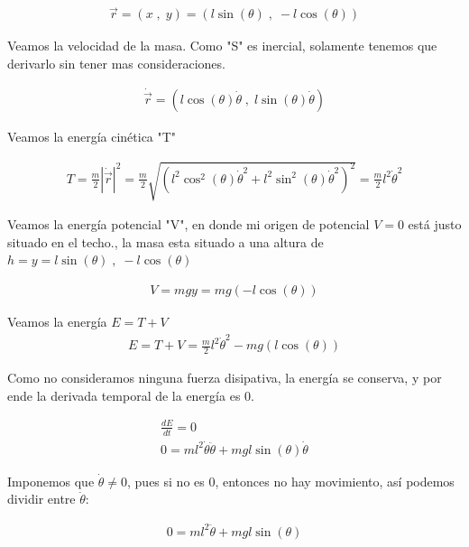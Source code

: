 \documentclass[11pt]{article}
\newcommand{\comillas}[1]{"#1"} %
\begin{document}
		\begin{align*}
			\vec{r} = \left( x \;,\; y\right)  = \left(  l\sin(\theta) \;,\; -l\cos(\theta) \right) 
		\end{align*}
		
		Veamos la velocidad de la masa. Como \comillas{S} es inercial, solamente tenemos que derivarlo sin tener mas consideraciones.
		
		\begin{align*}
			\dot{\vec{r}} = \left( l\cos(\theta)\dot{\theta} \;,\; l\sin(\theta)\dot{\theta} \right) 
		\end{align*}
		
		Veamos la energía cinética \comillas{T}
		
		\begin{align*}
			T = \frac{m}{2} \left| \dot{\vec{r}} \right|^2  = \frac{m}{2}\sqrt{(l^2\cos^2(\theta)\dot{\theta}^2 + l^2\sin^2(\theta)\dot{\theta}^2)^2} = \frac{m}{2}l^2\dot{\theta}^2
		\end{align*}
		
		Veamos la energía potencial \comillas{V}, en donde mi origen de potencial $V = 0$ está justo situado en el techo., la masa esta situado a una altura de $h = y = l\sin(\theta) \;,\; -l\cos(\theta)$
		
		\begin{align*}
			V = mgy = mg\left( -l\cos(\theta) \right) 
		\end{align*}
		
		Veamos la energía $E = T + V$
		\begin{align}
			E = T + V = \frac{m}{2}l^2\dot{\theta}^2 - mg\left( l\cos(\theta) \right) 
			\label{eq: E}
		\end{align}
		
		Como no consideramos ninguna fuerza disipativa, la energía se conserva, y por ende la derivada temporal de la energía es 0.
		
		\begin{align*}
			\frac{dE}{dt} = 0
			\\
			0 = ml^2\dot{\theta}\ddot{\theta} + mgl\sin(\theta)\dot{\theta}
		\end{align*}
		
		Imponemos que $\dot{\theta} \neq 0$, pues si no es 0, entonces no hay movimiento, así podemos dividir entre $\dot{\theta}$:
		
		\begin{align*}
			0 = ml^2\ddot{\theta} + mgl\sin(\theta)
		\end{align*}
		
\end{document}
